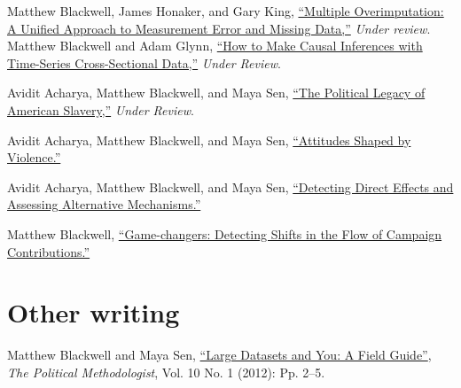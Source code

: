 \documentclass[margin,line]{res}
\newenvironment{list1}{
  \begin{list}{\ding{113}}{%
      \setlength{\itemsep}{0in}
      \setlength{\parsep}{0in} \setlength{\parskip}{0in}
      \setlength{\topsep}{0in} \setlength{\partopsep}{0in} 
      \setlength{\leftmargin}{0.83 cm}}}{\end{list}}
\begin{document}
\begin{resume}
Matthew Blackwell, James Honaker, and Gary King, \href{http://gking.harvard.edu/files/measure.pdf}{``Multiple Overimputation: A Unified Approach to Measurement Error and
Missing Data,''} \emph{Under review}.\vspace{1em}\\
Matthew Blackwell and Adam Glynn, \href{http://www.mattblackwell.org/files/papers/causal-tscs.pdf}{``How to Make Causal Inferences with Time-Series
  Cross-Sectional Data,''} \emph{Under Review}.

Avidit Acharya, Matthew Blackwell, and Maya Sen, \href{http://www.mattblackwell.org/files/papers/slavery.pdf}{``The Political Legacy of American Slavery,''} \emph{Under Review}.

Avidit Acharya, Matthew Blackwell, and Maya Sen, \href{http://www.mattblackwell.org/files/papers/slaverytheory.pdf}{``Attitudes Shaped by Violence.''}

Avidit Acharya, Matthew Blackwell, and Maya Sen, \href{http://www.mattblackwell.org/files/papers/direct-effects.pdf}{``Detecting Direct Effects and Assessing Alternative
Mechanisms.''}

Matthew Blackwell, \href{http://www.mattblackwell.org/files/papers/gamechangers.pdf}{``Game-changers: Detecting Shifts in the Flow
  of Campaign Contributions.''}




\section{\sc Other writing}

Matthew Blackwell and Maya Sen, 
\href{http://polmeth.wustl.edu/methodologist/tpm_v20_n1.pdf}{``Large
  Datasets and You: A Field Guide''}, \emph{The Political
  Methodologist}, Vol. 10 No. 1 (2012): Pp. 2--5.


\end{resume}
\end{document}
